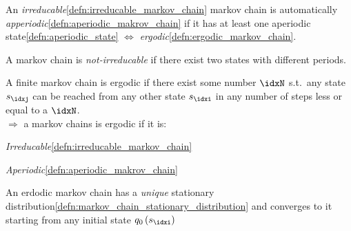 \begin{corbox}\nospacing
  \begin{cor}
    An \textit{irreducable}\cref{defn:irreducable_markov_chain} markov chain is automatically \textit{apperiodic}\cref{defn:aperiodic_makrov_chain} if it has at least one aperiodic state\cref{defn:aperiodic_state} $\iff$ \textit{ergodic}\cref{defn:ergodic_markov_chain}.
  \end{cor}
\end{corbox}
\begin{corbox}\nospacing
  \begin{cor}
    A markov chain is \textit{not-irreducable} if there exist two states with different periods.
  \end{cor}
\end{corbox}
\begin{defnbox}\nospacing
  \begin{defn}\label{defn:ergodic_markov_chain}
    A finite markov chain is ergodic if there exist some number $\idxN$ s.t.\ any
    state $s_{\idxj}$ can be reached from any other state $s_{\idxi}$ in any number of steps less or equal to a $\idxN$.\\
    $\Rightarrow$ a markov chains is ergodic if it is:
    \begin{circlelist}
      \item \textit{Irreducable}\cref{defn:irreducable_markov_chain}
      \item \textit{Aperiodic}\cref{defn:aperiodic_makrov_chain}
    \end{circlelist}
  \end{defn}
\end{defnbox}
\begin{corbox}\nospacing
  \begin{cor}\label{cor:distribution_of_ergodic_markov_chains}
    An erdodic markov chain has a \textit{unique} stationary distribution\cref{defn:markov_chain_stationary_distribution}
    and converges to it starting from any initial state $q_{0}\left(s_{\idxi}\right)$
  \end{cor}
\end{corbox}
